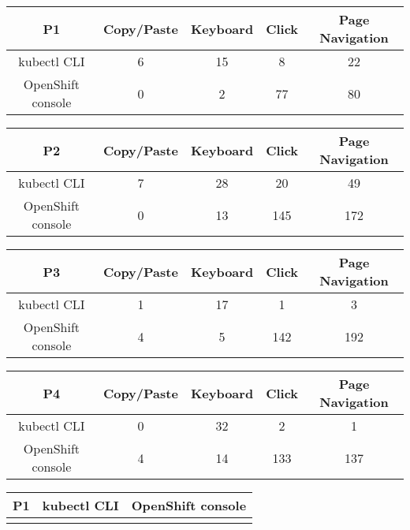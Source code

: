 \documentclass[11pt, oneside]{article}   	%
\begin{document}
\begin{center}
\begin{tabular}{ | c | c | c | c | c | } 
  \hline
  P1 & Copy/Paste & Keyboard & Click & Page Navigation \\ 
  \hline
  kubectl CLI & 6 & 15 & 8 & 22 \\ 
  \hline
  OpenShift console & 0 & 2 & 77 & 80 \\ 
  \hline
\end{tabular}
\end{center}

\begin{center}
\begin{tabular}{ | c | c | c | c | c | } 
  \hline
  P2 & Copy/Paste & Keyboard & Click & Page Navigation \\ 
  \hline
  kubectl CLI & 7 & 28 & 20 & 49 \\ 
  \hline
  OpenShift console & 0 & 13 & 145 & 172 \\ 
  \hline
\end{tabular}
\end{center}

\begin{center}
\begin{tabular}{ | c | c | c | c | c | } 
  \hline
  P3 & Copy/Paste & Keyboard & Click & Page Navigation \\ 
  \hline
  kubectl CLI & 1 & 17 & 1 & 3 \\ 
  \hline
  OpenShift console & 4 & 5 & 142 & 192 \\ 
  \hline
\end{tabular}
\end{center}

\begin{center}
\begin{tabular}{ | c | c | c | c | c | } 
  \hline
  P4 & Copy/Paste & Keyboard & Click & Page Navigation \\ 
  \hline
  kubectl CLI & 0 & 32 & 2 & 1 \\ 
  \hline
  OpenShift console & 4 & 14 & 133 & 137 \\ 
  \hline
\end{tabular}
\end{center}

\begin{center}
\begin{tabular}{ | c | c | c | } 
  \hline
  P1 & kubectl CLI & OpenShift console \\ 
  \hline
   &  &  \\ 
  \hline
\end{tabular}
\end{center}
\end{document}
